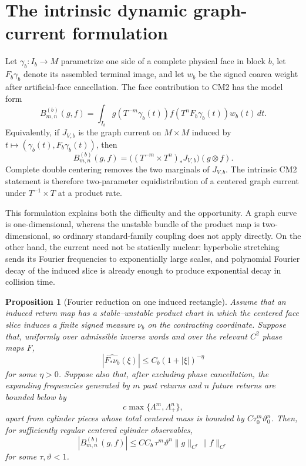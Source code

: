 \documentclass[11pt]{article}
\newtheorem{proposition}[theorem]{Proposition}
\begin{document}
\section{The intrinsic dynamic graph-current formulation}

Let $\gamma_b:I_b\to M$ parametrize one side of a complete physical face in
block $b$, let $F_b\gamma_b$ denote its assembled terminal image, and let
$w_b$ be the signed coarea weight after artificial-face cancellation.  The
face contribution to CM2 has the model form
\begin{equation}
\label{eq:dynamic-graph}
 B_{m,n}^{(b)}(g,f)
 =\int_{I_b} g(T^{-m}\gamma_b(t))
                  f(T^nF_b\gamma_b(t))w_b(t)\,dt .
\end{equation}
Equivalently, if $J_{V,b}$ is the graph current on $M\times M$ induced by
$t\mapsto(\gamma_b(t),F_b\gamma_b(t))$, then
\begin{equation}
\label{eq:product-current}
 B_{m,n}^{(b)}(g,f)
 =\bigl((T^{-m}\times T^n)_*J_{V,b}\bigr)(g\otimes f).
\end{equation}
Complete double centering removes the two marginals of $J_{V,b}$.  The
intrinsic CM2 statement is therefore two-parameter equidistribution of a
centered graph current under $T^{-1}\times T$ at a product rate.

This formulation explains both the difficulty and the opportunity.  A graph
curve is one-dimensional, whereas the unstable bundle of the product map is
two-dimensional, so ordinary standard-family coupling does not apply
directly.  On the other hand, the current need not be statically nuclear:
hyperbolic stretching sends its Fourier frequencies to exponentially large
scales, and polynomial Fourier decay of the induced slice is already enough
to produce exponential decay in collision time.

\begin{proposition}[Fourier reduction on one induced rectangle]
\label{prop:fourier-reduction}
Assume that an induced return map has a stable--unstable product chart in
which the centered face slice induces a finite signed measure $\nu_b$ on the
contracting coordinate.  Suppose that, uniformly over admissible inverse
words and over the relevant $C^2$ phase maps $F$,
\begin{equation}
\label{eq:fourier-decay}
 |\widehat{F_*\nu_b}(\xi)|\le C_b(1+|\xi|)^{-\eta}
\end{equation}
for some $\eta>0$.  Suppose also that, after excluding phase cancellation,
the expanding frequencies generated by $m$ past returns and $n$ future
returns are bounded below by
\[
 c\max\{\Lambda_-^m,\Lambda_+^n\},
\]
apart from cylinder pieces whose total centered mass is bounded by
$C\tau_0^m\vartheta_0^n$.  Then, for sufficiently regular
centered cylinder observables,
\begin{equation}
 |B_{m,n}^{(b)}(g,f)|
 \le C C_b\,\tau^m\vartheta^n\|g\|_{C^r}\|f\|_{C^r}
\end{equation}
for some $\tau,\vartheta<1$.
\end{proposition}
\end{document}
